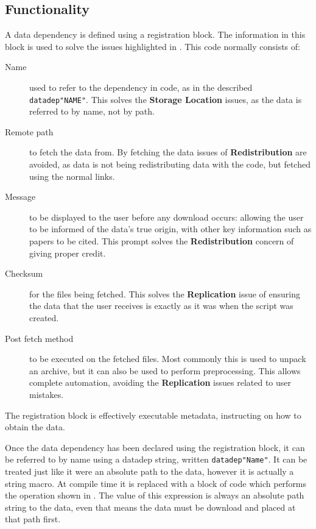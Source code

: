 \documentclass[twoside,11pt]{article}
\newcommand{\datadep}[1]{\texttt{datadep"{}#1"{}}}
\begin{document}
\subsection{Functionality}
A data dependency is defined using a registration block.
The information in this block is used to solve the issues highlighted in .
This code normally consists of:
\begin{description}
	\item[Name] used to refer to the dependency in code, as in the described \datadep{NAME}. 
	This solves the \textbf{Storage Location} issues, as the data is referred to by name, not by path.
	\item[Remote path] to fetch the data from. By fetching the data issues of \textbf{Redistribution} are avoided, as data is not being redistributing data with the code, but fetched using the normal links.
	\item[Message] to be displayed to the user before any download occurs:  allowing the user to be informed of the data's true origin, with other key information such as papers to be cited. This prompt solves the  \textbf{Redistribution} concern of giving proper credit.
	\item[Checksum] for the files being fetched. This solves the \textbf{Replication} issue of ensuring the data that the user receives is exactly as it was when the script was created.
	\item[Post fetch method] to be executed on the fetched files. Most commonly this is used to unpack an archive, but it can also be used to perform preprocessing. This allows complete automation, avoiding the \textbf{Replication} issues related to user mistakes.
\end{description}
\noindent The registration block is effectively executable metadata, instructing on how to obtain the data.

Once the data dependency has been declared using the registration block, it can be referred to by name using a datadep string, written \datadep{Name}.
It can be treated just like it were an absolute path to the data, however it is actually a string macro.
At compile time it is replaced with a block of code which performs the operation shown in .
The value of this expression is always an absolute path string to the data, even that means the data must be download and placed at that path first.
\end{document}

